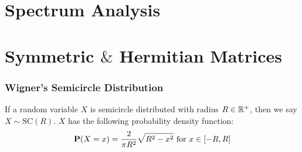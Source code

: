 

\section{Spectrum Analysis}









\section{Symmetric $\&$ Hermitian Matrices}

\begin{frame} \frametitle{Wigner's Semicircle Distribution}

\begin{alertblock}{}
If a random variable $X$ is semicircle distributed with radius $R \in \mathbb{R}^+$, then we say $X \sim \text{SC}(R)$. $X$ has the following probability density function:
$$\textbf{P}(X = x) = \frac{2}{\pi R^2} \sqrt{R^2 - x^2} \text{ for } x \in [-R, R]$$
\end{alertblock}

\end{frame}









